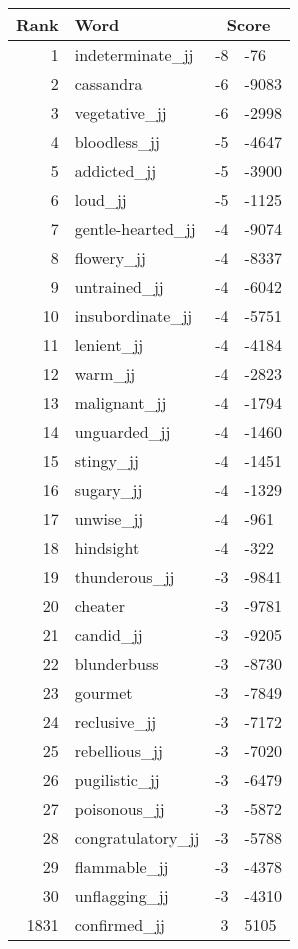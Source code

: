 \begin{longtable}[!htbp]{| rlr@{.}l |}
    \hline
    \textbf{Rank} & \textbf{Word} & \multicolumn{2}{c|}{\textbf{Score}} \\
    \hline
    \endhead
    1 & indeterminate\_jj & -8 & -76 \\
    2 & cassandra & -6 & -9083 \\
    3 & vegetative\_jj & -6 & -2998 \\
    4 & bloodless\_jj & -5 & -4647 \\
    5 & addicted\_jj & -5 & -3900 \\
    6 & loud\_jj & -5 & -1125 \\
    7 & gentle-hearted\_jj & -4 & -9074 \\
    8 & flowery\_jj & -4 & -8337 \\
    9 & untrained\_jj & -4 & -6042 \\
    10 & insubordinate\_jj & -4 & -5751 \\
    11 & lenient\_jj & -4 & -4184 \\
    12 & warm\_jj & -4 & -2823 \\
    13 & malignant\_jj & -4 & -1794 \\
    14 & unguarded\_jj & -4 & -1460 \\
    15 & stingy\_jj & -4 & -1451 \\
    16 & sugary\_jj & -4 & -1329 \\
    17 & unwise\_jj & -4 & -961 \\
    18 & hindsight & -4 & -322 \\
    19 & thunderous\_jj & -3 & -9841 \\
    20 & cheater & -3 & -9781 \\
    21 & candid\_jj & -3 & -9205 \\
    22 & blunderbuss & -3 & -8730 \\
    23 & gourmet & -3 & -7849 \\
    24 & reclusive\_jj & -3 & -7172 \\
    25 & rebellious\_jj & -3 & -7020 \\
    26 & pugilistic\_jj & -3 & -6479 \\
    27 & poisonous\_jj & -3 & -5872 \\
    28 & congratulatory\_jj & -3 & -5788 \\
    29 & flammable\_jj & -3 & -4378 \\
    30 & unflagging\_jj & -3 & -4310 \\
    1831 & confirmed\_jj & 3 & 5105 \\

\end{longtable}
